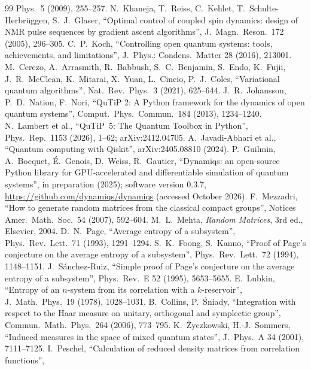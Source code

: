 \documentclass[11pt]{article}
\begin{document}
{\begin{thebibliography}{99}
  Phys.\ 5 (2009), 255--257.
 N.~Khaneja, T.~Reiss, C.~Kehlet, T.~Schulte-Herbr\"uggen, S.~J.~Glaser, ``Optimal control of
  coupled spin dynamics: design of NMR pulse sequences by gradient ascent algorithms'', J.\ Magn.\ Reson.\ 172 (2005),
  296--305.
 C.~P.~Koch, ``Controlling open quantum systems: tools, achievements, and limitations'', J.\ Phys.:
  Condens.\ Matter 28 (2016), 213001.
 M.~Cerezo, A.~Arrasmith, R.~Babbush, S.~C.~Benjamin, S.~Endo, K.~Fujii, J.~R.~McClean, K.~Mitarai,
  X.~Yuan, L.~Cincio, P.~J.~Coles, ``Variational quantum algorithms'', Nat.\ Rev.\ Phys.\ 3 (2021), 625--644.
 J.~R.~Johansson, P.~D.~Nation, F.~Nori, ``QuTiP 2: A Python framework for the
  dynamics of open quantum systems'', Comput.\ Phys.\ Commun.\ 184 (2013), 1234--1240.
 N.~Lambert et al., ``QuTiP~5: The Quantum Toolbox in Python'', Phys.\ Rep.\ 1153 (2026),
  1--62; arXiv:2412.04705.
 A.~Javadi-Abhari et al., ``Quantum computing with Qiskit'', arXiv:2405.08810 (2024).
 P.~Guilmin, A.~Bocquet, \'E.~Genois, D.~Weiss, R.~Gautier, ``Dynamiqs: an open-source Python
  library for GPU-accelerated and differentiable simulation of quantum systems'', in preparation (2025);
  software version 0.3.7, \url{https://github.com/dynamiqs/dynamiqs} (accessed October 2026).
 F.~Mezzadri, ``How to generate random matrices from the classical compact
  groups'', Notices Amer.\ Math.\ Soc.\ 54 (2007), 592--604.
 M.~L.~Mehta, \emph{Random Matrices}, 3rd ed., Elsevier, 2004.
 D.~N.~Page, ``Average entropy of a subsystem'', Phys.\ Rev.\ Lett.\ 71 (1993),
  1291--1294.
 S.~K.~Foong, S.~Kanno, ``Proof of Page's conjecture on the average entropy of a subsystem'',
  Phys.\ Rev.\ Lett.\ 72 (1994), 1148--1151.
 J.~S\'anchez-Ruiz, ``Simple proof of Page's conjecture on the average entropy of a
  subsystem'', Phys.\ Rev.\ E 52 (1995), 5653--5655.
 E.~Lubkin, ``Entropy of an $n$-system from its correlation with a $k$-reservoir'', J.\ Math.\ Phys.\ 19 (1978), 1028--1031.
 B.~Collins, P.~\'Sniady, ``Integration with respect to the Haar measure on unitary,
  orthogonal and symplectic group'', Commun.\ Math.\ Phys.\ 264 (2006), 773--795.
 K.~\.Zyczkowski, H.-J.~Sommers, ``Induced measures in the space of mixed quantum
  states'', J.\ Phys.\ A 34 (2001), 7111--7125.
 I.~Peschel, ``Calculation of reduced density matrices from correlation functions'',

\end{thebibliography}}
\end{document}
